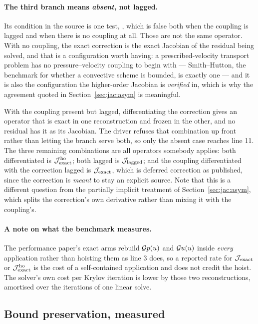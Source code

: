 \paragraph{The third branch means \emph{absent}, not lagged.} Its condition in the source is
one test, , which
is false both when the coupling is lagged and when there is no coupling at all. Those are not the
same operator. With no coupling, the exact correction is the exact Jacobian of the residual being
solved, and that is a configuration worth having: a prescribed-velocity transport problem has no
pressure--velocity coupling to begin with --- Smith--Hutton, the benchmark for whether a
convective scheme is bounded, is exactly one --- and it is also the configuration the
higher-order Jacobian is \emph{verified} in, which is why the agreement quoted in
Section~\ref{sec:jac:asym} is meaningful.

With the coupling present but lagged, differentiating the correction gives an operator that is
exact in one reconstruction and frozen in the other, and no residual has it as its Jacobian. The
driver refuses that combination up front rather than letting the branch serve both, so only the
absent case reaches line 11. The three remaining combinations are all operators somebody applies:
both differentiated is $\mathcal{J}^{\mathrm{ho}}_{\mathrm{exact}}$; both lagged is $\mathcal{J}_{\mathrm{lagged}}$; and the coupling differentiated with the
correction lagged is $\mathcal{J}_{\mathrm{exact}}$, which is deferred correction as published, since the correction is
\emph{meant} to stay an explicit source. Note that this is a different question from the
partially implicit treatment of Section~\ref{sec:jac:asym}, which splits the correction's own
derivative rather than mixing it with the coupling's.

\paragraph{A note on what the benchmark measures.} The performance paper's exact arms rebuild
$\mathcal{G} p(u)$ and $\mathcal{G} u(u)$ inside \emph{every} application rather than hoisting them as line 3
does, so a reported rate for $\mathcal{J}_{\mathrm{exact}}$ or $\mathcal{J}^{\mathrm{ho}}_{\mathrm{exact}}$ is the cost of a self-contained application and
does not credit the hoist. The solver's own cost per Krylov iteration is lower by those two
reconstructions, amortised over the iterations of one linear solve.

\subsection{Bound preservation, measured}

